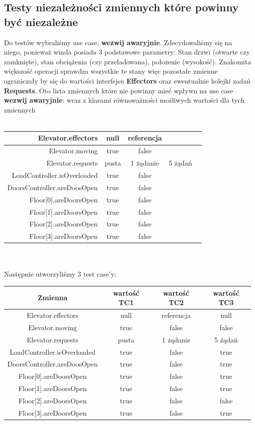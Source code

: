\documentclass[a4paper,11pt]{article}
\begin{document}
\subsection{Testy niezależności zmiennych które powinny być niezależne}
Do testów wybraliśmy use case: \textbf{ wezwij awaryjnie}. Zdecydowaliśmy się na niego, ponieważ winda posiada 3 podstawowe parametry:
Stan drzwi (otwarte czy zamknięte), stan obciążenia (czy przeładowana), położenie (wysokość). Znakomita większość operacji sprawdza
wszystkie te stany więc pozostałe zmienne ograniczały by się do wartości interfejsu \textbf{Effectors} 
oraz ewentualnie kolejki zadań \textbf{Requests}.
Oto lista zmiennych które nie powinny mieć wpływu na use case \textbf{ wezwij awaryjnie}: wraz z klasami równoważności
możliwych wartości dla tych zmiennych \\ \\
\begin{tabular}{|r|c|c|c|c|}
\hline
Elevator.effectors & null & referencja & \\ \hline
Elevator.moving & true & false & \\ \hline
Elevator.requests  & pusta & 1 żądanie & 5 żądań \\ \hline
LoadController.isOverloaded & true & false & \\ \hline
DoorsController.areDoosOpen & true & false &\\ \hline
Floor[0].areDoorsOpen & true & false & \\ \hline
Floor[1].areDoorsOpen & true & false & \\ \hline
Floor[2].areDoorsOpen & true & false & \\ \hline
Floor[3].areDoorsOpen & true & false & \\ \hline 
\end{tabular}
\\ \\
Następnie utworzyliśmy 3 test case'y:
\\
\begin{tabular}{|c|c|c|c|}
\hline
\textbf{Zmienna} & \textbf{wartość TC1} & \textbf{wartość TC2} & \textbf{wartość TC3}  \\ \hline
Elevator.effectors & null & referencja & null \\ \hline
Elevator.moving & true & false & false\\ \hline
Elevator.requests  & pusta & 1 żądanie & 5 żądań \\ \hline
LoadController.isOverloaded & true & false & true\\ \hline
DoorsController.areDoosOpen & true & false & true\\ \hline
Floor[0].areDoorsOpen & true & false & true \\ \hline
Floor[1].areDoorsOpen & true & false & true \\ \hline
Floor[2].areDoorsOpen & true & false & false \\ \hline
Floor[3].areDoorsOpen & true & false & true \\ \hline 
	
\end{tabular}
\end{document}
